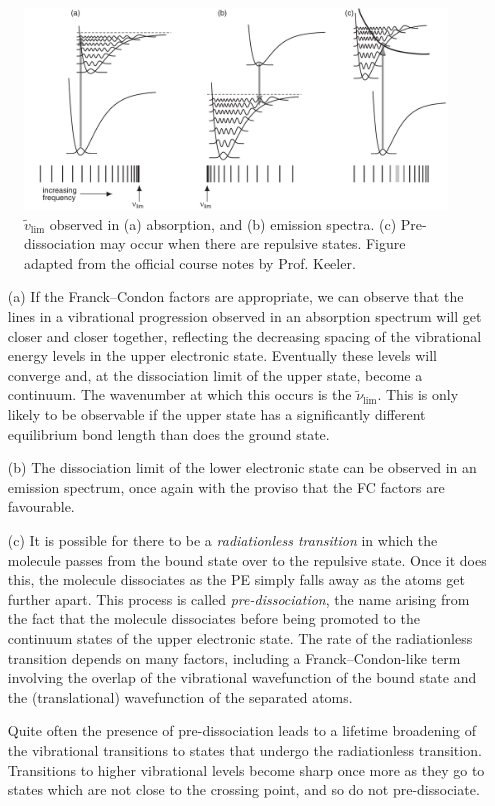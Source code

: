 \documentclass{article}
\theoremstyle{plain}\theoremheaderfont{\normalfont\itshape}\theorembodyfont{\rmfamily}\theoremseparator{.}\newtheorem*{rem}{Remark}\newtheorem*{ex}{Example}\newtheorem*{proof}{Proof}\newtheorem*{altp}{Alternative proof}
\theoremstyle{plain}\theoremheaderfont{\normalfont\bfseries}\theorembodyfont{\rmfamily}\theoremseparator{.}\newtheorem{thm}{Theorem}[section]\newtheorem{lem}[thm]{Lemma}\newtheorem{prop}[thm]{Proposition}\newtheorem*{cor}{Corollary}\newtheorem{defn}[thm]{Definition}\newtheorem{clm}[thm]{Claim}\newtheorem{clminproof}{Claim}\newtheorem{pos}{Postulate}[section]
\theoremstyle{break}\theoremheaderfont{\normalfont\itshape}\theorembodyfont{\rmfamily}\theoremseparator{.\medskip}\newtheorem*{proofskip}{Proof}\newtheorem*{exs}{Examples}\newtheorem*{rems}{Remarks}
\theoremstyle{break}\theoremheaderfont{\normalfont\bfseries}\theorembodyfont{\rmfamily}\theoremseparator{.\medskip}\newtheorem{lemskip}[thm]{Lemma}\newtheorem{defnskip}[thm]{Definition}\newtheorem{propskip}[thm]{Proposition}\newtheorem{thmskip}[thm]{Theorem}
\numberwithin{equation}{section}
\begin{document}
    \begin{figure}
        \centering
        \includegraphics[width=\textwidth]{Dissoc.png}
        \caption{\(\tilde{v}_{\text{lim}}\) observed in (a) absorption, and (b) emission spectra. (c) Pre-dissociation may occur when there are repulsive states. Figure adapted from the official course notes by Prof. Keeler.}
    \end{figure}
    \begin{enumerate}
        \item[(a)] If the Franck--Condon factors are appropriate, we can observe that the lines in a vibrational progression observed in an absorption spectrum will get closer and closer together, reflecting the decreasing spacing of the vibrational energy levels in the upper electronic state. Eventually these levels will converge and, at the dissociation limit of the upper state, become a continuum. The wavenumber at which this occurs is the \(\tilde{\nu}_{\text{lim}}\). This is only likely to be observable if the upper state has a significantly different equilibrium bond length than does the ground state.
        \item[(b)] The dissociation limit of the lower electronic state can be observed in an emission spectrum, once again with the proviso that the FC factors are favourable.
        \item[(c)] It is possible for there to be a \textit{radiationless transition} in which the molecule passes from the bound state over to the repulsive state. Once it does this, the molecule dissociates as the PE simply falls away as the atoms get further apart. This process is called \textit{pre-dissociation}, the name arising from the fact that the molecule dissociates before being promoted to the continuum states of the upper electronic state. The rate of the radiationless transition depends on many factors, including a Franck--Condon-like term involving the overlap of the vibrational wavefunction of the bound state and the (translational) wavefunction of the separated atoms.
        
        Quite often the presence of pre-dissociation leads to a lifetime broadening of the vibrational transitions to states that undergo the radiationless transition. Transitions to higher vibrational levels become sharp once more as they go to states which are not close to the crossing point, and so do not pre-dissociate.
    \end{enumerate}
\end{document}
